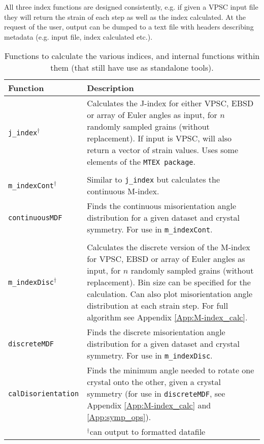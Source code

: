 \documentclass[a4paper,12pt,twoside]{report}
\numberwithin{equation}{chapter}
\begin{document}
All three index functions are designed consistently, e.g. if given a VPSC input file they will return the strain of each step as well as the index calculated. At the request of the user, output can be dumped to a text file with headers describing metadata (e.g. input file, index calculated etc.).                                                                                                                    

\begin{table}[h!] 
	\centering
	\caption[Functions: index calculation]{Functions to calculate the various indices, and internal functions within them (that still have use as standalone tools).}
	\noindent
	
\begin{tabularx}{\textwidth}{lX}

\hline
\hline
Function    & Description   \\ 
\hline
\hline
\texttt{j\_{}index}$^{\dagger}$ & Calculates the J-index for either VPSC, EBSD or array of Euler angles as input, for $n$ randomly sampled grains (without replacement). If input is VPSC, will also return a vector of strain values. Uses some elements of the \texttt{MTEX package}. \\ 
\\
\hline

\texttt{m\_{}indexCont}$^{\dagger}$ & Similar to \texttt{j\_{}index} but calculates the continuous M-index. \\

\texttt{continuousMDF} & Finds the continuous misorientation angle distribution for a given dataset and crystal symmetry. For use in \texttt{m\_{}indexCont}. \\
\\
\hline

\texttt{m\_{}indexDisc}$^{\dagger}$ & Calculates the discrete version of the M-index for VPSC, EBSD or array of Euler angles as input, for $n$ randomly sampled grains (without replacement). Bin size can be specified for the calculation. Can also plot misorientation angle distribution at each strain step. For full algorithm see Appendix \ref{App:M-index_calc}. \\

\texttt{discreteMDF} & Finds the discrete misorientation angle distribution for a given dataset and crystal symmetry. For use in \texttt{m\_{}indexDisc}. \\

\texttt{calDisorientation} & Finds the minimum angle needed to rotate one crystal onto the other, given a crystal symmetry (for use in \texttt{discreteMDF}, see Appendix \ref{App:M-index_calc} and \ref{App:symp_ops}). \\
\hline
{} & $^\dagger$can output to formatted datafile \\
\hline
\hline
\end{tabularx}
\label{tab:index_functions}
\end{table}
\end{document}

